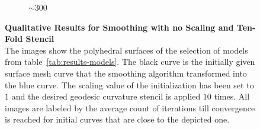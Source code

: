\documentclass{stdlocal}
\begin{document}
\begin{figure}
\begin{subfigure}[b]{0.24\linewidth}
    \caption{$\sim 300$}
  \end{subfigure}
  \caption[Qualitative Results for Smoothing with no Scaling and Ten-Fold Stencil]{%
    \textbf{Qualitative Results for Smoothing with no Scaling and Ten-Fold Stencil}\\
    The images show the polyhedral surfaces of the selection of models from table~\ref{tab:results-models}.
    The black curve is the initially given surface mesh curve that the smoothing algorithm transformed into the blue curve.
    The scaling value of the initialization has been set to $1$ and the desired geodesic curvature stencil is applied $10$ times.
    All images are labeled by the average count of iterations till convergence is reached for initial curves that are close to the depicted one.
  }
  \label{fig:results-no-scaling}
\end{figure}
\end{document}
